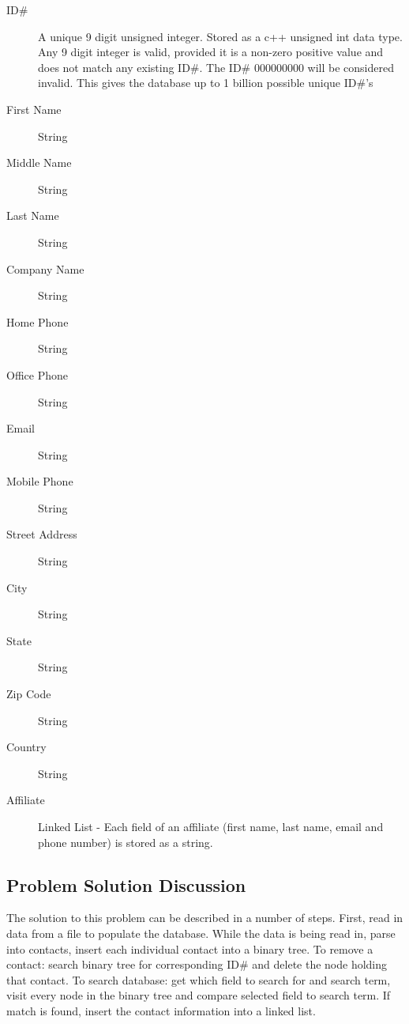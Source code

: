 \documentclass[11pt]{article}
\begin{document}
	\begin{description}
	
		\item[ID\#] A unique 9 digit unsigned integer. Stored as a c++ unsigned int data type. Any 9 digit integer is valid, 
					provided it is a non-zero positive value and does not match any existing ID\#. The ID\# 000000000 will
					be considered invalid. This gives the database up to 1 billion possible unique ID\#'s
					 
		\item[First Name] String
		\item[Middle Name] String
		\item[Last Name] String
		\item[Company Name] String
		\item[Home Phone] String
		\item[Office Phone] String
		\item[Email] String
		\item[Mobile Phone] String
		\item[Street Address] String
		\item[City] String
		\item[State] String
		\item[Zip Code] String
		\item[Country] String
		\item[Affiliate] Linked List - Each field of an affiliate (first name, last name, email and phone number) is stored
										as a string.
		
	\end{description}




\subsection*{Problem Solution Discussion}

The solution to this problem can be described in a number of steps. First, read in data from a file to populate the database. 
While the data is being read in, parse into contacts, insert each individual contact into a binary tree. To remove a contact: 
search binary tree for corresponding ID\# and delete the node holding that contact. To search database: get which field to 
search for and search term, visit every node in the binary tree and compare selected field to search term. If match is found,
 insert the contact information into a linked list. 
\end{document}
